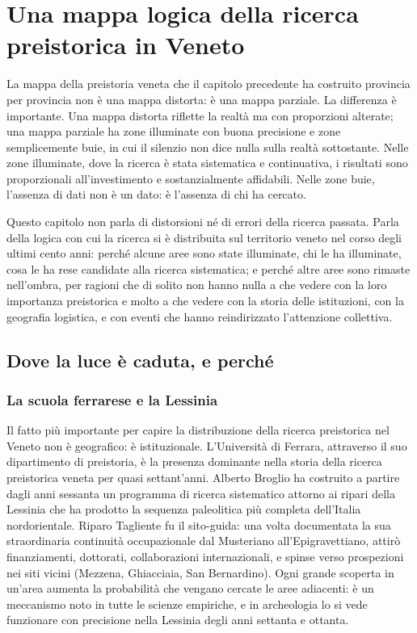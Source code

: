 \chapter{Una mappa logica della ricerca preistorica in Veneto}
\label{cap:research_bias}

La mappa della preistoria veneta che il capitolo precedente ha costruito provincia per provincia non è una mappa distorta: è una mappa parziale. La differenza è importante. Una mappa distorta riflette la realtà ma con proporzioni alterate; una mappa parziale ha zone illuminate con buona precisione e zone semplicemente buie, in cui il silenzio non dice nulla sulla realtà sottostante. Nelle zone illuminate, dove la ricerca è stata sistematica e continuativa, i risultati sono proporzionali all'investimento e sostanzialmente affidabili. Nelle zone buie, l'assenza di dati non è un dato: è l'assenza di chi ha cercato.

Questo capitolo non parla di distorsioni né di errori della ricerca passata. Parla della logica con cui la ricerca si è distribuita sul territorio veneto nel corso degli ultimi cento anni: perché alcune aree sono state illuminate, chi le ha illuminate, cosa le ha rese candidate alla ricerca sistematica; e perché altre aree sono rimaste nell'ombra, per ragioni che di solito non hanno nulla a che vedere con la loro importanza preistorica e molto a che vedere con la storia delle istituzioni, con la geografia logistica, e con eventi che hanno reindirizzato l'attenzione collettiva.

\section{Dove la luce è caduta, e perché}

\subsection{La scuola ferrarese e la Lessinia}

Il fatto più importante per capire la distribuzione della ricerca preistorica nel Veneto non è geografico: è istituzionale. L'Università di Ferrara, attraverso il suo dipartimento di preistoria, è la presenza dominante nella storia della ricerca preistorica veneta per quasi settant'anni. Alberto Broglio ha costruito a partire dagli anni sessanta un programma di ricerca sistematico attorno ai ripari della Lessinia che ha prodotto la sequenza paleolitica più completa dell'Italia nordorientale. Riparo Tagliente fu il sito-guida: una volta documentata la sua straordinaria continuità occupazionale dal Musteriano all'Epigravettiano, attirò finanziamenti, dottorati, collaborazioni internazionali, e spinse verso prospezioni nei siti vicini (Mezzena, Ghiacciaia, San Bernardino). Ogni grande scoperta in un'area aumenta la probabilità che vengano cercate le aree adiacenti: è un meccanismo noto in tutte le scienze empiriche, e in archeologia lo si vede funzionare con precisione nella Lessinia degli anni settanta e ottanta.


